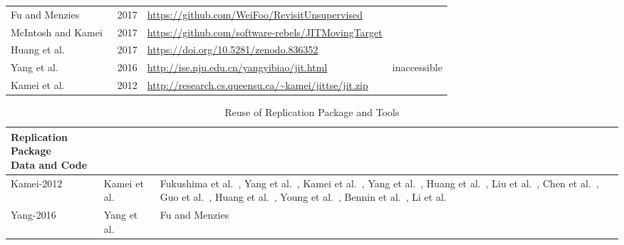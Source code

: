 \documentclass[acmsmall]{acmart}
\begin{document}
\begin{table}[!htbp]
\begin{tabular}{p{1.40in} p{0.20in} p{2.65in} p{0.6in}}
		
		Fu and Menzies~\cite{fu2017revisiting}
		& 2017
		& \url{https://github.com/WeiFoo/RevisitUnsupervised}
		\\
		
		McIntosh and Kamei~\cite{mcintosh2017fix}
		& 2017
		& \url{https://github.com/software-rebels/JITMovingTarget}
		\\
		
		
		Huang et al.~\cite{huang2017supervised}
		& 2017
		& \url{https://doi.org/10.5281/zenodo.836352}
		\\
		
		Yang et al.~\cite{yang2016effort}
		& 2016
		& \url{http://ise.nju.edu.cn/yangyibiao/jit.html}
		& inaccessible %
		\\
		
		Kamei et al.~\cite{kamei2012large}
		& 2012
		& \url{http://research.cs.queensu.ca/~kamei/jittse/jit.zip}
		\\
		\bottomrule
	\end{tabular}
\end{table}


\begin{table}[!htbp]
	\caption{Reuse of Replication Package and Tools}
	\label{tab:reusereppackage}
	\begin{tabular}{p{1.25in} p{1.25in} p{2.5in}}
		\toprule
		\makecell[{{p{1.25in}}}]{Replication Package\\Data and Code} 
		& \makecell[{{p{1.25in}}}]{Original Research} 
		& \makecell[{{p{2.50in}}}]{Dependent Research}\\
		\midrule
		Kamei-2012 
		& Kamei et al.~\cite{kamei2012large} 
		& 
		Fukushima et al.~\cite{fukushima2014empirical},
		Yang et al.~\cite{yang2015deep},
		Kamei et al.~\cite{kamei2016studying},
		Yang et al.~\cite{yang2016effort},
		Huang et al.~\cite{huang2017supervised},
		Liu et al.~\cite{liu2017code}, 
		Chen et al.~\cite{chen2018multi},
		Guo et al.~\cite{guo2018bridging},
		Huang et al.~\cite{huang2019revisiting},
		Young et al.~\cite{young2018replication}, 
		Bennin et al.~\cite{bennin2020revisiting},
		Li et al.~\cite{li2020effort}
		\\
		
		Yang-2016
		& Yang et al.~\cite{yang2016effort}
		&   Fu and Menzies~\cite{fu2017revisiting} \\
		
		\bottomrule
	\end{tabular}
\end{table}







\end{document}
